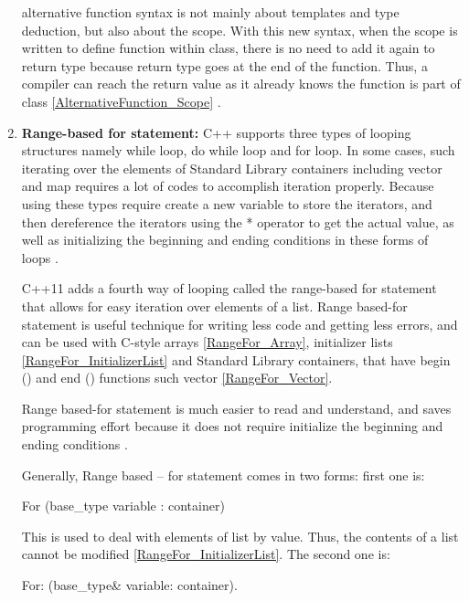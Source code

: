 \documentclass[11pt]{report}
\begin{document}
\begin{enumerate}
alternative function syntax is not mainly about templates and type deduction, but also about the scope.  With this new syntax, when the scope is written to define function within class, there is no need to add it again to return type because return type goes at the end of the function. Thus, a compiler can reach the return value as it already knows the function is part of class \ref{AlternativeFunction_Scope} \cite{Allain:2011:FutureCpp}.

\item \textbf{Range-based for statement:} C++ supports three types of looping structures namely while loop, do while loop and for loop. In some cases, such iterating over the elements of Standard Library containers including vector and map requires a lot of codes to accomplish iteration properly. Because using these types require create a new variable to store the iterators, and then dereference the iterators using the * operator to get the actual value, as well as initializing the beginning and ending conditions in these forms of loops \cite{Horstmann:2008:BC}.
\newline

C++11 adds a fourth way of looping called the range-based for statement that allows for easy iteration over elements of a list. Range based-for statement is useful technique for writing less code and getting less errors, and can be used with C-style arrays \ref{RangeFor_Array}, initializer lists \ref{RangeFor_InitializerList} and Standard Library containers, that have begin () and end () functions such vector \ref{RangeFor_Vector}. 
\newline

Range based-for statement is much easier to read and understand, and saves programming effort because it does not require initialize the beginning and ending conditions \cite{Overland:2011:CWF}.
\newline

Generally, Range based – for statement comes in two forms: first one is:
\begin{center}
For (base\_type  variable : container)
\end{center} 

This is used to deal with elements of list by value. Thus, the contents of a list cannot be modified \ref{RangeFor_InitializerList}. The second one is:
\begin{center}
For: (base\_type\& variable: container).
\end{center}


\end{enumerate}
\end{document}

